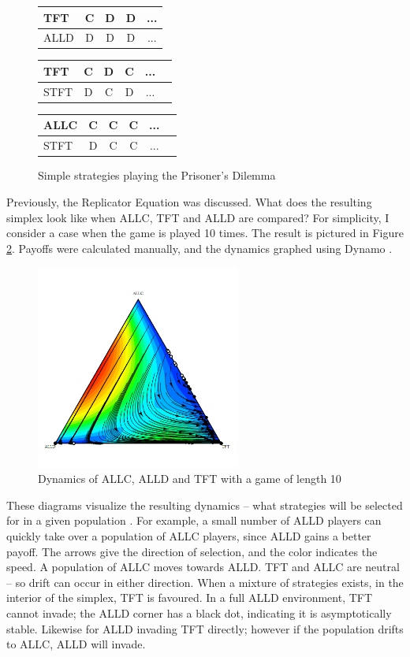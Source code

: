 \documentclass[a4paper,11pt,bcshonoursthesis,singlespace,oneside,thesisdraft,pdflatex]{cssethesis}
\begin{document}
\begin{figure}[h]
\centering
\captionsetup{justification=centering}
\begin{tabular}{|l|c|c|c|c|}
\hline
TFT & C & D & D&...\\
\hline
ALLD & D & D &D&...\\
\hline
\end{tabular}\hfill
\begin{tabular}{|l|c|c|c|c|c|}
\hline
TFT & C & D&C&...\\
\hline
STFT & D & C&D&...\\
\hline
\end{tabular}\hfill
\begin{tabular}{|l|c|c|c|c|c|}
\hline
ALLC & C & C&C&...\\
\hline
STFT & D & C&C&...\\
\hline
\end{tabular}\hfill
\caption{Simple strategies playing the Prisoner's Dilemma}
\label{table:reciprocity}
\end{figure}

Previously, the Replicator Equation was discussed. 
What does the resulting simplex look like when ALLC, TFT and ALLD are compared? 
For simplicity, I consider a case when the game is played 10 times. 
The result is pictured in Figure \ref{fig:allcalldtft}. 
Payoffs were calculated manually, and the dynamics graphed using Dynamo \citep{dynamo}.

\begin{figure}[h!]
\center
\includegraphics[width=0.6\textwidth]{allcalldtft}
\caption{Dynamics of ALLC, ALLD and TFT with a game of length 10}
\label{fig:allcalldtft}
\end{figure}
 
These diagrams visualize the resulting dynamics -- what strategies will be selected for in a given population \citep{imhof:PNAS:2005}. 
For example, a small number of ALLD players can quickly take over a population of ALLC players, since ALLD gains a better payoff. The arrows give the direction of selection, and the color indicates the speed. A population of ALLC moves towards ALLD. 
TFT and ALLC are neutral -- so drift can occur in either direction. 
When a mixture of strategies exists, in the interior of the simplex, TFT is favoured. 
In a full ALLD environment, TFT cannot invade; the ALLD corner has a black dot, indicating it is asymptotically stable. 
Likewise for ALLD invading TFT directly; however if the population drifts to ALLC, ALLD will invade. 
\end{document}
